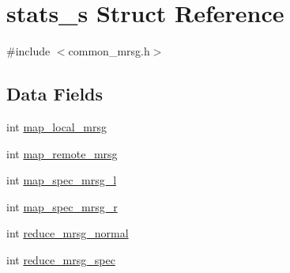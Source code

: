 \hypertarget{structstats__s}{\section{stats\-\_\-s \-Struct \-Reference}
\label{structstats__s}
}


{\ttfamily \#include $<$common\-\_\-mrsg.\-h$>$}

\subsection*{\-Data \-Fields}
\begin{DoxyCompactItemize}
\item 
int \hyperlink{structstats__s_a551f64e90a4b50dd743e753ddb0ba407}{map\-\_\-local\-\_\-mrsg}
\item 
int \hyperlink{structstats__s_a3b20e674030b2f0d5326a3dac4a7138e}{map\-\_\-remote\-\_\-mrsg}
\item 
int \hyperlink{structstats__s_a7838bdba19710ae0471786d0e0bd330e}{map\-\_\-spec\-\_\-mrsg\-\_\-l}
\item 
int \hyperlink{structstats__s_acc2549c011815ee64fb0e69276c0eb12}{map\-\_\-spec\-\_\-mrsg\-\_\-r}
\item 
int \hyperlink{structstats__s_a5dcff2c8a394579feaa7fad6bf34ecc6}{reduce\-\_\-mrsg\-\_\-normal}
\item 
int \hyperlink{structstats__s_afb2bfea4c36e73faab46a26790ec12a0}{reduce\-\_\-mrsg\-\_\-spec}
\end{DoxyCompactItemize}


